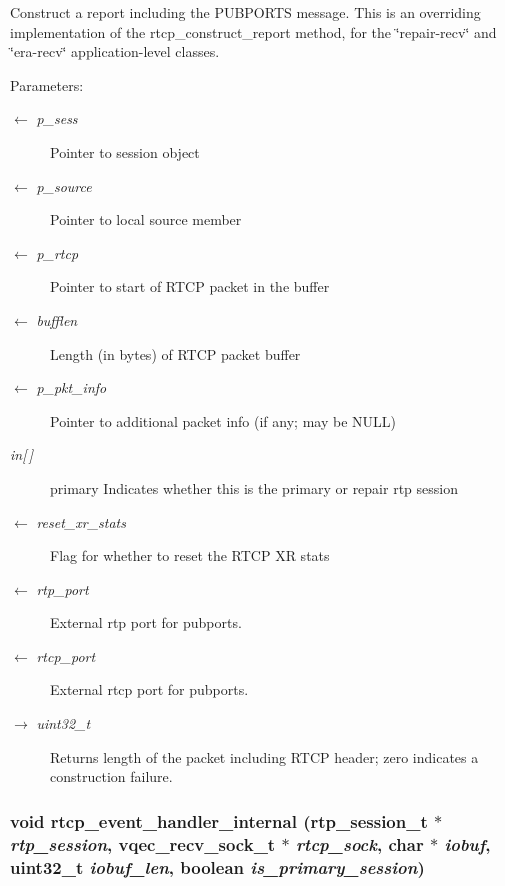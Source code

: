 Construct a report including the PUBPORTS message. This is an overriding implementation of the rtcp\_\-construct\_\-report method, for the \char`\"{}repair-recv\char`\"{} and \char`\"{}era-recv\char`\"{} application-level classes.

\begin{Desc}
\item[Parameters:]
\begin{description}
\item[\mbox{$\leftarrow$} {\em p\_\-sess}]Pointer to session object \item[\mbox{$\leftarrow$} {\em p\_\-source}]Pointer to local source member \item[\mbox{$\leftarrow$} {\em p\_\-rtcp}]Pointer to start of RTCP packet in the buffer \item[\mbox{$\leftarrow$} {\em bufflen}]Length (in bytes) of RTCP packet buffer \item[\mbox{$\leftarrow$} {\em p\_\-pkt\_\-info}]Pointer to additional packet info (if any; may be NULL) \item[{\em in\mbox{[}$\,$\mbox{]}}]primary Indicates whether this is the primary or repair rtp session \item[\mbox{$\leftarrow$} {\em reset\_\-xr\_\-stats}]Flag for whether to reset the RTCP XR stats \item[\mbox{$\leftarrow$} {\em rtp\_\-port}]External rtp port for pubports. \item[\mbox{$\leftarrow$} {\em rtcp\_\-port}]External rtcp port for pubports. \item[\mbox{$\rightarrow$} {\em uint32\_\-t}]Returns length of the packet including RTCP header; zero indicates a construction failure. \end{description}
\end{Desc}
\subsubsection{\setlength{\rightskip}{0pt plus 5cm}void rtcp\_\-event\_\-handler\_\-internal (rtp\_\-session\_\-t $\ast$ {\em rtp\_\-session}, vqec\_\-recv\_\-sock\_\-t $\ast$ {\em rtcp\_\-sock}, char $\ast$ {\em iobuf}, uint32\_\-t {\em iobuf\_\-len}, boolean {\em is\_\-primary\_\-session})}\label{vqec__rtp_8c_f21ac10ead959dd2d1374891ef1f9ae3}


